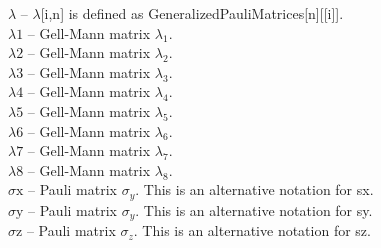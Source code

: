 \documentclass[a4paper,10pt]{scrartcl}
\begin{document}
\textbf{$ \lambda  $ }-- $\lambda $[i,n] is defined as GeneralizedPauliMatrices[n][[i]].$  $\\

\textbf{$ \text{$\lambda $1} $ }-- Gell-Mann matrix $ \lambda _1. $\\

\textbf{$ \text{$\lambda $2} $ }-- Gell-Mann matrix $ \lambda _2. $\\

\textbf{$ \text{$\lambda $3} $ }-- Gell-Mann matrix $ \lambda _3. $\\

\textbf{$ \text{$\lambda $4} $ }-- Gell-Mann matrix $ \lambda _4. $\\

\textbf{$ \text{$\lambda $5} $ }-- Gell-Mann matrix $ \lambda _5. $\\

\textbf{$ \text{$\lambda $6} $ }-- Gell-Mann matrix $ \lambda _6. $\\

\textbf{$ \text{$\lambda $7} $ }-- Gell-Mann matrix $ \lambda _7. $\\

\textbf{$ \text{$\lambda $8} $ }-- Gell-Mann matrix $ \lambda _8. $\\

\textbf{$ \text{$\sigma $x} $ }-- Pauli matrix $ \sigma _y $. This is an alternative notation for sx.$  $\\

\textbf{$ \text{$\sigma $y} $ }-- Pauli matrix $ \sigma _y $. This is an alternative notation for sy.$  $\\

\textbf{$ \text{$\sigma $z} $ }-- Pauli matrix $ \sigma _z $. This is an alternative notation for sz.$  $\\
\end{document}
